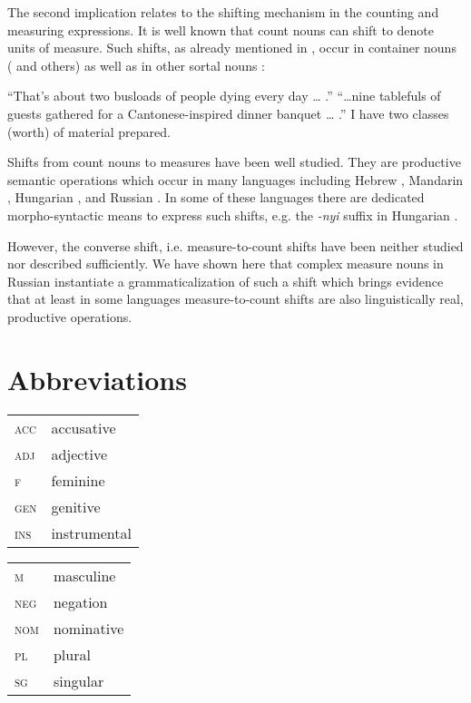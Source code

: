 \documentclass[output=paper,
colorlinks,
citecolor=brown,
newtxmath
]{langscibook}
\begin{document}
\noindent The second implication relates to the shifting mechanism in the counting and measuring expressions. It is well known that count nouns can shift to denote units of measure. Such shifts, as already mentioned in , occur in container nouns (\citealt{Doetjes1997,Landman2004,Rothstein2009} and others) as well as in other sortal nouns  \citep{Rothstein2017}:

    \largerpage %

\ea\label{ex:44}
    \ea ``That's about two busloads of people dying every day {\dots} .''
    \ex ``\dots nine tablefuls of guests gathered for a Cantonese-inspired dinner banquet {\dots} .''
    \ex I have two classes (worth) of material prepared. \hfill \citep[216f.]{Rothstein2017}
\z\z

\noindent Shifts from count nouns to measures have been well studied. They are productive semantic operations which occur in many languages including Hebrew \citep{Rothstein2009}, Mandarin \citep{Li2013}, Hungarian \citep{Schvarcz2014}, and Russian \citep{Partee.Borschev2012,Khrizman2016a,Khrizman2016b}. In some of these languages there are dedicated morpho-syntactic means to express such shifts, e.g. the \textit{-nyi} suffix in Hungarian \citep{Schvarcz2014,Schvarcz2017}.

However, the converse shift, i.e. measure-to-count shifts have been neither studied nor described sufficiently. We have shown here that complex measure nouns in Russian instantiate a grammaticalization of such a shift which brings evidence that at least in some languages measure-to-count shifts are also linguistically real, productive operations.


\section*{Abbreviations}

\begin{tabularx}{.5\textwidth}{@{}lX@{}}
\textsc{acc}& accusative\\
\textsc{adj}& adjective \\
\textsc{f}& feminine \\
\textsc{gen}& genitive \\
\textsc{ins}& instrumental \\
\end{tabularx}%
\begin{tabularx}{.5\textwidth}{@{}lX@{}}
\textsc{m}& masculine \\
\textsc{neg}& negation \\
\textsc{nom}& nominative \\
\textsc{pl}& plural \\
\textsc{sg}& singular \\
\end{tabularx}
\end{document}
